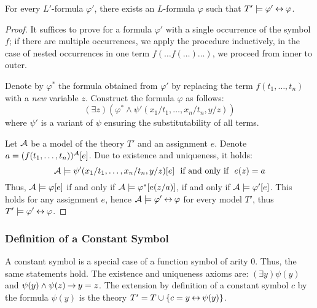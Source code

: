 \begin{proposition}
    For every $L'$-formula $\varphi'$, there exists an $L$-formula $\varphi$ such that $T'\models\varphi'\mathbin{\leftrightarrow}\varphi$.
\end{proposition}
\begin{proof}
    It suffices to prove for a formula $\varphi'$ with a single occurrence of the symbol $f$; if there are multiple occurrences, we apply the procedure inductively, in the case of nested occurrences in one term $f(\dots f(\dots)\dots)$, we proceed from inner to outer.

    Denote by $\varphi^*$ the formula obtained from $\varphi'$ by replacing the term $f(t_1,\dots,t_n)$ with a \emph{new} variable $z$. Construct the formula $\varphi$ as follows:
    $$
    (\exists z)(\varphi^*\land \psi'(x_1/t_1,\dots,x_n/t_n,y/z))
    $$
    where $\psi'$ is a variant of $\psi$ ensuring the substitutability of all terms.

    Let $\mathcal{A}$ be a model of the theory $T'$ and an assignment $e$. Denote $a=(f(t_1,\dots,t_n))^{\mathcal{A}}[e]$. Due to existence and uniqueness, it holds:
    $$
    \A\models\psi'(x_1/t_1,\dots,x_n/t_n,y/z)[e]\ \text{ if and only if }\ e(z)=a 
    $$
    Thus, $\mathcal{A}\models\varphi[e]$ if and only if $\mathcal{A}\models\varphi^*[e(z/a)]$, if and only if $\mathcal{A}\models\varphi'[e]$. This holds for any assignment $e$, hence $\mathcal{A}\models\varphi'\mathbin{\leftrightarrow}\varphi$ for every model $T'$, thus $T'\models\varphi'\mathbin{\leftrightarrow}\varphi$.
\end{proof}

\subsubsection*{Definition of a Constant Symbol}

A constant symbol is a special case of a function symbol of arity 0. Thus, the same statements hold. The existence and uniqueness axioms are: $(\exists y)\psi(y)$ and $\psi(y)\land\psi(z)\mathbin{\rightarrow} y=z$. The extension by definition of a constant symbol $c$ by the formula $\psi(y)$ is the theory $T'=T\cup\{c=y\mathbin{\leftrightarrow} \psi(y)\}$.

